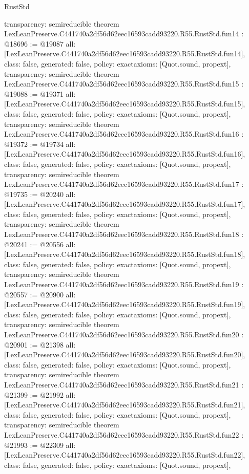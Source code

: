 \begin{lexlean}{RustStd}
\begin{coremodule}
{  transparency: semireducible
}
theorem LexLeanPreserve.C441740a2df56d62eec16593cadd93220.R55.RustStd.fun14 : @18696 := @19087 {
  all: [LexLeanPreserve.C441740a2df56d62eec16593cadd93220.R55.RustStd.fun14],
  class: false,
  generated: false,
  policy: exact{axioms: [Quot.sound, propext]},
  transparency: semireducible
}
theorem LexLeanPreserve.C441740a2df56d62eec16593cadd93220.R55.RustStd.fun15 : @19088 := @19371 {
  all: [LexLeanPreserve.C441740a2df56d62eec16593cadd93220.R55.RustStd.fun15],
  class: false,
  generated: false,
  policy: exact{axioms: [Quot.sound, propext]},
  transparency: semireducible
}
theorem LexLeanPreserve.C441740a2df56d62eec16593cadd93220.R55.RustStd.fun16 : @19372 := @19734 {
  all: [LexLeanPreserve.C441740a2df56d62eec16593cadd93220.R55.RustStd.fun16],
  class: false,
  generated: false,
  policy: exact{axioms: [Quot.sound, propext]},
  transparency: semireducible
}
theorem LexLeanPreserve.C441740a2df56d62eec16593cadd93220.R55.RustStd.fun17 : @19735 := @20240 {
  all: [LexLeanPreserve.C441740a2df56d62eec16593cadd93220.R55.RustStd.fun17],
  class: false,
  generated: false,
  policy: exact{axioms: [Quot.sound, propext]},
  transparency: semireducible
}
theorem LexLeanPreserve.C441740a2df56d62eec16593cadd93220.R55.RustStd.fun18 : @20241 := @20556 {
  all: [LexLeanPreserve.C441740a2df56d62eec16593cadd93220.R55.RustStd.fun18],
  class: false,
  generated: false,
  policy: exact{axioms: [Quot.sound, propext]},
  transparency: semireducible
}
theorem LexLeanPreserve.C441740a2df56d62eec16593cadd93220.R55.RustStd.fun19 : @20557 := @20900 {
  all: [LexLeanPreserve.C441740a2df56d62eec16593cadd93220.R55.RustStd.fun19],
  class: false,
  generated: false,
  policy: exact{axioms: [Quot.sound, propext]},
  transparency: semireducible
}
theorem LexLeanPreserve.C441740a2df56d62eec16593cadd93220.R55.RustStd.fun20 : @20901 := @21398 {
  all: [LexLeanPreserve.C441740a2df56d62eec16593cadd93220.R55.RustStd.fun20],
  class: false,
  generated: false,
  policy: exact{axioms: [Quot.sound, propext]},
  transparency: semireducible
}
theorem LexLeanPreserve.C441740a2df56d62eec16593cadd93220.R55.RustStd.fun21 : @21399 := @21992 {
  all: [LexLeanPreserve.C441740a2df56d62eec16593cadd93220.R55.RustStd.fun21],
  class: false,
  generated: false,
  policy: exact{axioms: [Quot.sound, propext]},
  transparency: semireducible
}
theorem LexLeanPreserve.C441740a2df56d62eec16593cadd93220.R55.RustStd.fun22 : @21993 := @22309 {
  all: [LexLeanPreserve.C441740a2df56d62eec16593cadd93220.R55.RustStd.fun22],
  class: false,
  generated: false,
  policy: exact{axioms: [Quot.sound, propext]},
}
\end{coremodule}
\end{lexlean}
